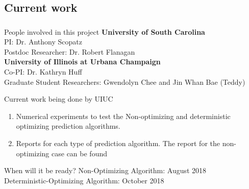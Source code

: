 \subsection{Current work}
\begin{frame}
\frametitle{}

\begin{block}{People involved in this project}
	\textbf{University of South Carolina}\\
	PI: Dr. Anthony Scopatz \\
	Postdoc Researcher: Dr. Robert Flanagan \\
	\textbf{University of Illinois at Urbana Champaign} \\
	Co-PI: Dr. Kathryn Huff \\
	Graduate Student Researchers: Gwendolyn Chee and Jin Whan Bae (Teddy)
\end{block}

\begin{block}{Current work being done by UIUC}
	\begin{enumerate}
		\item Numerical experiments to test the Non-optimizing and deterministic optimizing prediction algorithms. 
		\item Reports for each type of prediction algorithm. The report for the non-optimizing case can be found \cite{bae_numerical_2018}
	\end{enumerate}
\end{block}

\begin{block}{When will it be ready? }
	Non-Optimizing Algorithm: August 2018	\\
	Deterministic-Optimizing Algorithm: October 2018	
\end{block}


\end{frame}